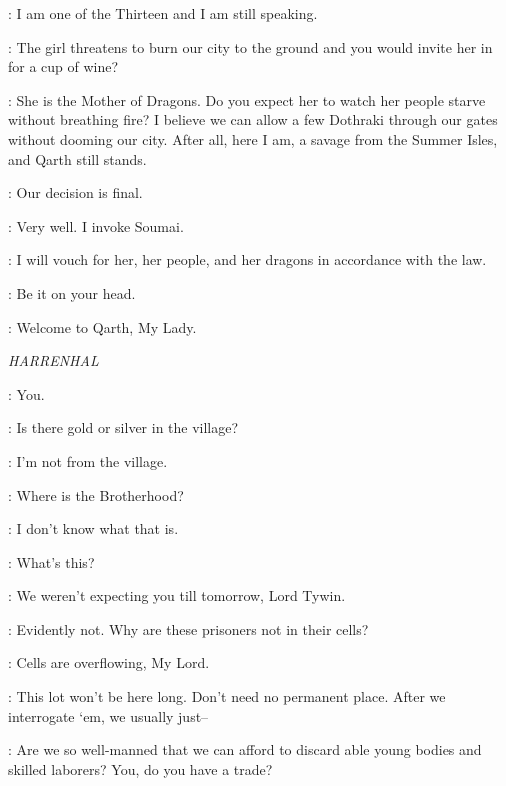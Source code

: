 \XARO: I am one of the Thirteen and I am still speaking. 

\SPICEKING: The girl threatens to burn our city to the ground and you would invite her in for a cup of wine? 

\XARO: She is the Mother of Dragons. Do you expect her to watch her people starve without breathing fire? I believe we can allow a few Dothraki through our gates without dooming our city. After all, here I am, a savage from the Summer Isles, and Qarth still stands. 

\SPICEKING: Our decision is final. 

\XARO: Very well. I invoke Soumai. 


\XARO: I will vouch for her, her people, and her dragons in accordance with the law. 

\SPICEKING: Be it on your head. 

\XARO: Welcome to Qarth, My Lady. 



\scene

\textit{HARRENHAL} 


\MOUNTAIN: You. 


\TICKLER: Is there gold or silver in the village? 

\GENDRY: I'm not from the village. 

\TICKLER: Where is the Brotherhood? 

\GENDRY: I don't know what that is. 


\TYWIN: What's this? 

\MOUNTAIN: We weren't expecting you till tomorrow, Lord Tywin. 

\TYWIN: Evidently not. Why are these prisoners not in their cells? 

\MOUNTAIN: Cells are overflowing, My Lord. 

\POLLIVER: This lot won't be here long. Don't need no permanent place. After we interrogate `em, we usually just-- 

\TYWIN: Are we so well-manned that we can afford to discard able young bodies and skilled laborers? You, do you have a trade? 

